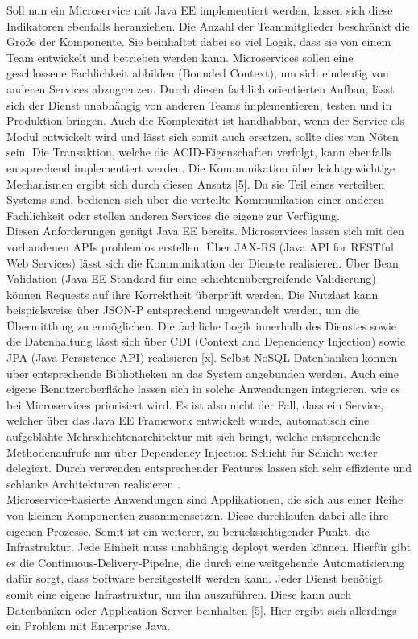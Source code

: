 Soll nun ein Microservice mit Java EE implementiert werden, lassen sich diese Indikatoren ebenfalls heranziehen. Die Anzahl der Teammitglieder beschränkt die Größe der Komponente. Sie beinhaltet dabei so viel Logik, dass sie von einem Team entwickelt und betrieben werden kann. Microservices sollen eine geschlossene Fachlichkeit abbilden (Bounded Context), um sich eindeutig von anderen Services abzugrenzen. Durch diesen fachlich orientierten Aufbau, lässt sich der Dienst unabhängig von anderen Teams implementieren, testen und in Produktion bringen. Auch die Komplexität ist handhabbar, wenn der Service als Modul entwickelt wird und lässt sich somit auch ersetzen, sollte dies von Nöten sein. Die Transaktion, welche die ACID-Eigenschaften verfolgt, kann ebenfalls entsprechend implementiert werden. Die Kommunikation über leichtgewichtige Mechanismen ergibt sich durch diesen Ansatz [5]. Da sie Teil eines verteilten Systems sind, bedienen sich über die verteilte Kommunikation einer anderen Fachlichkeit oder stellen anderen Services die eigene zur Verfügung.  \\ 
Diesen Anforderungen genügt Java EE bereits. Microservices lassen sich mit den vorhandenen APIs problemlos erstellen. Über JAX-RS (Java API for RESTful Web Services) lässt sich die Kommunikation der Dienste realisieren. Über Bean Validation (Java EE-Standard für eine schichtenübergreifende Validierung) können Requests auf ihre Korrektheit überprüft werden. Die Nutzlast kann beispielsweise über JSON-P entsprechend umgewandelt werden, um die Übermittlung zu ermöglichen. Die fachliche Logik innerhalb des Dienstes sowie die Datenhaltung lässt sich über CDI (Context and Dependency Injection) sowie JPA (Java Persistence API) realisieren [x]. Selbst NoSQL-Datenbanken können über entsprechende Bibliotheken an das System angebunden werden. Auch eine eigene Benutzeroberfläche lassen sich in solche Anwendungen integrieren, wie es bei Microservices priorisiert wird. Es ist also nicht der Fall, dass ein Service, welcher über das Java EE Framework entwickelt wurde, automatisch eine aufgeblähte Mehrschichtenarchitektur mit sich bringt, welche entsprechende Methodenaufrufe nur über Dependency Injection Schicht für Schicht weiter delegiert. Durch verwenden entsprechender Features lassen sich sehr effiziente und schlanke Architekturen realisieren \cite{jaxcenter.2016}.\\
Microservice-basierte Anwendungen sind Applikationen, die sich aus einer Reihe von kleinen Komponenten zusammensetzen. Diese durchlaufen dabei alle ihre eigenen Prozesse. Somit ist ein weiterer, zu berücksichtigender Punkt, die Infrastruktur. Jede Einheit muss unabhängig deployt werden können. Hierfür gibt es die Continuous-Delivery-Pipelne, die durch eine weitgehende Automatisierung dafür sorgt, dass Software bereitgestellt werden kann. Jeder Dienst benötigt somit eine eigene Infrastruktur, um ihn auszuführen. Diese kann auch Datenbanken oder Application Server beinhalten [5]. Hier ergibt sich allerdings ein Problem mit Enterprise Java.


